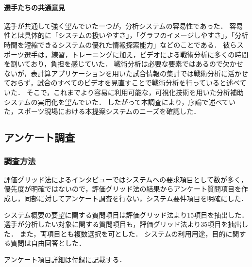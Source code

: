 \documentclass[sotsuron]{kuee}
\begin{document}
				\paragraph{選手たちの共通意見}
					選手が共通して強く望んでいた一つが，分析システムの容易性であった．
					容易性とは具体的に「システムの扱いやすさ」，「グラフのイメージしやすさ」，「分析時間を短縮できるシステムの優れた情報探索能力」などのことである．
					彼らスポーツ選手は，練習，トレーニングに加え，ビデオによる戦術分析に多くの時間を割いており，負担を感じていた．
					戦術分析は必要な要素ではあるので欠かせないが，表計算アプリケーションを用いた試合情報の集計では戦術分析に活かせておらず，試合のすべてのビデオを見直すことで戦術分析を行っていると述べていた．
					そこで，これまでより容易に利用可能な，可視化技術を用いた分析補助システムの実用化を望んでいた．
					したがって本調査により，序論で述べていた，スポーツ現場における本提案システムのニーズを確認した．
		\subsection{アンケート調査}
			\subsubsection{調査方法}
				評価グリッド法によるインタビューではシステムへの要求項目として数が多く，優先度が明確ではないので，評価グリッド法の結果からアンケート質問項目を作成し，同部に対してアンケート調査を行ない，システム要件項目を明確にした．
				
				システム概要の要望に関する質問項目は評価グリッド法より15項目を抽出した．
				選手が分析したい対象に関する質問項目も，評価グリッド法より35項目を抽出した．
				また，両項目とも複数選択を可とした．
				システムの利用用途，目的に関する質問は自由回答とした．
				
				アンケート項目詳細は付録に記載する．
\end{document}
